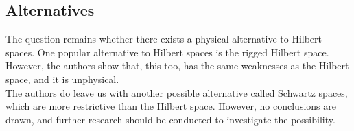 \documentclass[12pt]{article}
\begin{document}
\begin{multicols}{2}
    \section*{Alternatives}
    The question remains whether there exists a physical alternative to Hilbert spaces. One popular alternative to Hilbert spaces is the rigged Hilbert space\cite{de_la_madrid_role_2005}. However, the authors show that, this too, has the same weaknesses as the Hilbert space, and it is unphysical.\\
    The authors do leave us with another possible alternative called Schwartz spaces, which are more restrictive than the Hilbert space. However, no conclusions are drawn, and further research should be conducted to investigate the possibility.
\end{multicols}
\printbibliography
\end{document}
